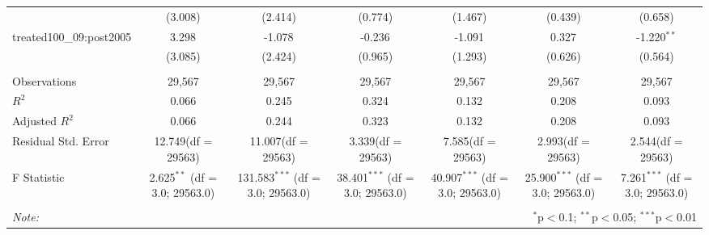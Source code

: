 \documentclass[12pt]{article}
\begin{document}
\begin{table}[!htbp]
\begin{tabular}{@{\extracolsep{5pt}}lcccccc}
  & (3.008) & (2.414) & (0.774) & (1.467) & (0.439) & (0.658) \\
 treated100_09:post2005 & 3.298$^{}$ & -1.078$^{}$ & -0.236$^{}$ & -1.091$^{}$ & 0.327$^{}$ & -1.220$^{**}$ \\
  & (3.085) & (2.424) & (0.965) & (1.293) & (0.626) & (0.564) \\
\hline \\[-1.8ex]
 Observations & 29,567 & 29,567 & 29,567 & 29,567 & 29,567 & 29,567 \\
 $R^2$ & 0.066 & 0.245 & 0.324 & 0.132 & 0.208 & 0.093 \\
 Adjusted $R^2$ & 0.066 & 0.244 & 0.323 & 0.132 & 0.208 & 0.093 \\
 Residual Std. Error & 12.749(df = 29563) & 11.007(df = 29563) & 3.339(df = 29563) & 7.585(df = 29563) & 2.993(df = 29563) & 2.544(df = 29563)  \\
 F Statistic & 2.625$^{**}$ (df = 3.0; 29563.0) & 131.583$^{***}$ (df = 3.0; 29563.0) & 38.401$^{***}$ (df = 3.0; 29563.0) & 40.907$^{***}$ (df = 3.0; 29563.0) & 25.900$^{***}$ (df = 3.0; 29563.0) & 7.261$^{***}$ (df = 3.0; 29563.0) \\
\hline
\hline \\[-1.8ex]
\textit{Note:} & \multicolumn{6}{r}{$^{*}$p$<$0.1; $^{**}$p$<$0.05; $^{***}$p$<$0.01} \\
\end{tabular}
\end{table}
\end{document}
